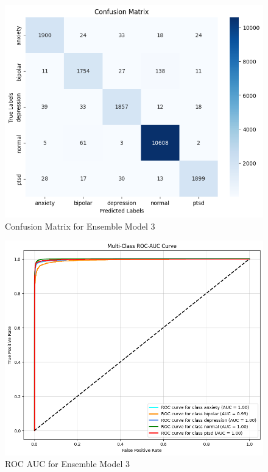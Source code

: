 \begin{figure}[h!]  
    \centering
    \includegraphics[width=1.0\textwidth]{Images/EM FINAL CM.png}  
    \caption{Confusion Matrix for Ensemble Model 3}
    \label{dfdl1244883}  %
\end{figure}

\begin{figure}[h!]  
    \centering
    \includegraphics[width=1.0\textwidth]{Images/EM FINAL ROC.png}  
    \caption{ROC AUC for Ensemble Model 3}
    \label{dfdl1244883}  %
\end{figure}

